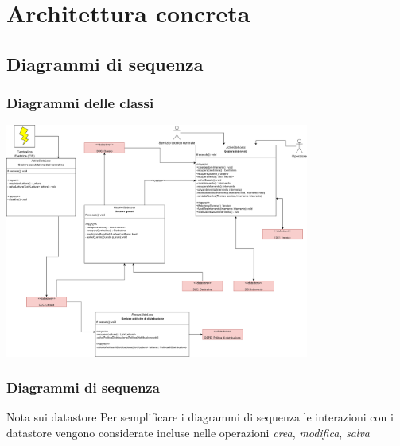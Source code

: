 \documentclass{beamer}
\begin{document}
	\section{Architettura concreta}
	
	\subsection{Diagrammi di sequenza}
	
\begin{frame}
	\frametitle{Diagrammi delle classi}
		\begin{center}
			\includegraphics[width=0.75\textwidth, height=0.75\textheight, keepaspectratio=true]{diagramma_classi.png}
		\end{center}
\end{frame}

\begin{frame}
	\frametitle{Diagrammi di sequenza}
	\begin{center}
		\begin{block}{Nota sui datastore}
			Per semplificare i diagrammi di sequenza le interazioni con i datastore vengono considerate incluse nelle operazioni
			\textit{crea}, \textit{modifica}, \textit{salva}
		\end{block}
	\end{center}
\end{frame}
\end{document}
